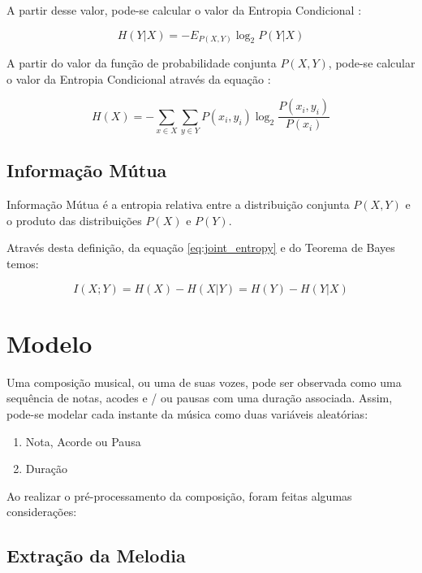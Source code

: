 A partir desse valor, pode-se calcular o valor da Entropia Condicional \cite{livro}:

\begin{equation}
    H(Y|X) = - E_{P(X,Y)} \log_2{P(Y|X)}
\end{equation}

A partir do valor da função de probabilidade conjunta $P(X,Y)$, pode-se calcular o valor da Entropia Condicional através da equação \cite{livro}:

\begin{equation}
    H(X) = - \sum_{x \in X}\sum_{y \in Y} P(x_i, y_i) \log_2{\frac{P(x_i, y_i)}{P(x_i)}}
\end{equation}


\subsection{Informação Mútua}

Informação Mútua é a entropia relativa entre a distribuição conjunta $P(X,Y)$ e o produto das distribuições $P(X)$ e $P(Y)$. \cite{livro}

Através desta definição, da equação \ref{eq:joint_entropy} e do Teorema de Bayes \cite{bayes} temos:

\begin{equation}
    I(X;Y) = H(X) - H(X|Y) = H(Y) - H(Y|X)
\end{equation}


\section{Modelo}

Uma composição musical, ou uma de suas vozes, pode ser observada como uma sequência de notas, acodes e / ou pausas com uma duração associada. Assim, pode-se modelar cada instante da música como duas variáveis aleatórias:

\begin{enumerate}
    \item Nota, Acorde ou Pausa
    \item Duração
\end{enumerate}

Ao realizar o pré-processamento da composição, foram feitas algumas considerações:

\subsection{Extração da Melodia}

